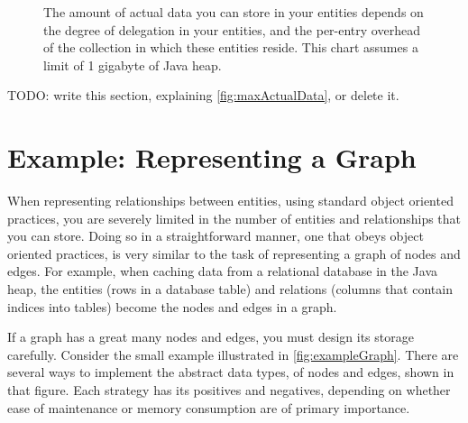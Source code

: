\begin{figure}
	\caption{The amount of actual data you can store in your entities depends on
	the degree of delegation in your entities, and the per-entry overhead of the collection in which these entities
	reside. This chart assumes a limit of 1 gigabyte of Java heap.}
	\label{fig:maxActualData}
\end{figure}

TODO: write this section, explaining \autoref{fig:maxActualData}, or delete it.

\section{Example: Representing a Graph}

When representing relationships between entities, using standard object oriented
practices, you are severely limited in the number of entities and relationships
that you can store. Doing so in a straightforward manner, one that obeys object
oriented practices, is very similar to the task of representing a graph of nodes
and edges. For example, when caching data from a relational database in the Java
heap, the entities (rows in a database table) and relations (columns that contain
indices into tables) become the nodes and edges in a graph.

If a graph has a great many nodes and edges, you must design its storage
carefully. Consider the small example illustrated in 
\autoref{fig:exampleGraph}. There are several ways to implement the abstract
data types, of nodes and edges, shown in that figure. Each strategy has its
positives and negatives, depending on whether ease of maintenance or memory
consumption are of primary importance.

